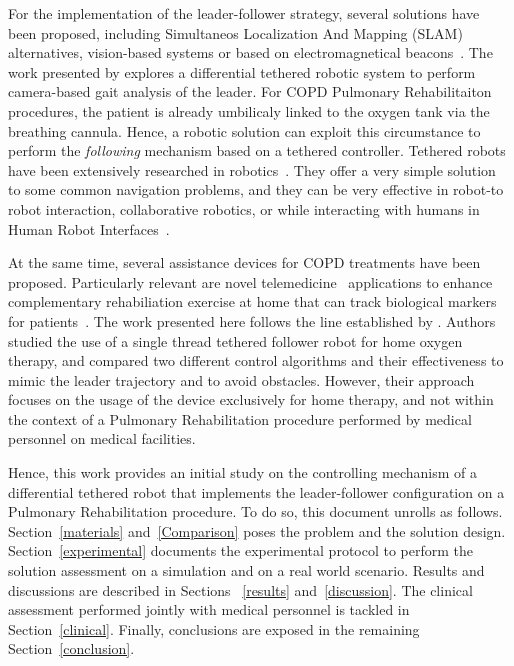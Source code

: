 \documentclass[journal]{IEEEtran}
\begin{document}
For the implementation of the leader-follower strategy, several solutions have been proposed, including Simultaneos Localization And Mapping (SLAM) alternatives, vision-based systems or based on electromagnetical beacons~\cite{Islam2019}.   The work presented by \cite{Ortlieb2016} explores a differential tethered robotic system to perform camera-based gait analysis of the leader.  For COPD Pulmonary Rehabilitaiton procedures, the patient is already umbilicaly linked to the oxygen tank via the breathing cannula.  Hence, a robotic solution can exploit this circumstance to perform the \textit{following} mechanism based on a tethered controller. Tethered robots have been extensively researched in robotics~\cite{Ahn2006}.  They offer a very simple solution to some common navigation problems, and they can be very effective in robot-to robot interaction, collaborative robotics, or while interacting with humans in Human Robot Interfaces~\cite{Rekleitis2001,Hirata2009,Ferrin2010}. 

At the same time, several assistance devices for COPD treatments have been proposed.  Particularly relevant are novel telemedicine~\cite{Banerjee2020} applications to enhance complementary rehabiliation exercise at home that can track biological markers for patients~\cite{Yang2018,Wu2012}.  The work presented here follows the line established by \cite{Endo2015}.  Authors studied the use of a single thread tethered follower robot for home oxygen therapy, and compared two different control algorithms and their effectiveness to mimic the leader trajectory and to avoid obstacles.  However, their approach focuses on the usage of the device exclusively for home therapy, and not within the context of a Pulmonary Rehabilitation procedure performed by medical personnel on medical facilities.

Hence, this work provides an initial study on the controlling mechanism of a differential tethered robot that implements the leader-follower configuration on a Pulmonary Rehabilitation procedure.  To do so, this document unrolls as follows.  Section~\ref{materials} and~\ref{Comparison} poses the problem and the solution design. Section~\ref{experimental} documents the experimental protocol to perform the solution assessment on a simulation and on a real world scenario.  Results and discussions are described in Sections ~\ref{results} and~\ref{discussion}. The clinical assessment performed jointly with medical personnel is tackled in Section~\ref{clinical}.  Finally, conclusions are exposed in the remaining Section~\ref{conclusion}.
\end{document}
